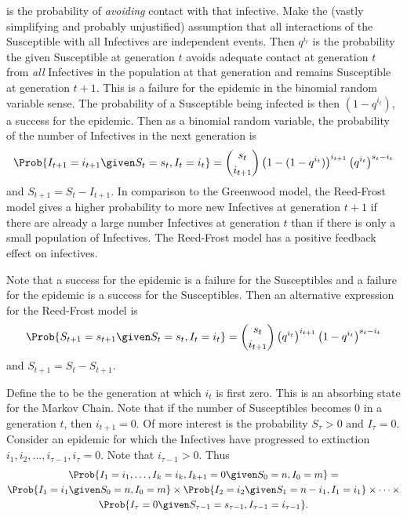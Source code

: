 \documentclass[12pt]{article}
\begin{document}
is the probability of \emph{avoiding} contact with that infective.  Make
the (vastly simplifying and probably unjustified) assumption that all
interactions of the Susceptible with all Infectives are independent
events. Then \( q^{i_t} \) is the probability the given Susceptible at
generation \( t \) avoids adequate contact at generation \( t \) from
\emph{all} Infectives in the population at that generation and remains
Susceptible at generation \( t + 1 \).  This is a failure for the
epidemic in the binomial random variable sense.  The probability of a
Susceptible being infected is then \( (1 - q^{i_t}) \), a success for
the epidemic.  Then as a binomial random variable, the probability of
the number of Infectives in the next generation is
\[
    \Prob{I_{t+1} = i_{t+1} \given S_t=s_t, I_t=i_t} = \binom{s_t}{i_{t+1}}
    \left(1 - (1-q^{i_t})\right)^{i_{t+1}}\left(q^{i_t}\right)^{s_t-i_t}
\] and \( S_{t+1} = S_t - I_{t+1} \). In comparison to the Greenwood
model, the Reed-Frost model gives a higher probability to more new
Infectives at generation \( t+1 \) if there are already a large number
Infectives at generation \( t \) than if there is only a small
population of Infectives. The Reed-Frost model has a positive feedback
effect on infectives.

Note that a success for the epidemic is a failure for the Susceptibles
and a failure for the epidemic is a success for the Susceptibles. Then
an alternative expression for the Reed-Frost model is
\[
    \Prob{S_{t+1} = s_{t+1} \given S_t=s_t, I_t=i_t} = \binom{s_t}{i_{t+1}}
    \left( q^{i_t}\right)^{i_{t+1}}\left(1 - q^{i_t}\right)^{s_t-i_t}
\] and \( S_{t+1} = S_t - S_{t+1} \).

Define the  to be the
generation at which \( i_t \) is first zero.  This is an absorbing state
for the Markov Chain.  Note that if the number of Susceptibles becomes \(
0 \) in a generation \( t \), then \( i_{t+1} = 0 \).  Of more interest
is the probability \( S_{\tau} > 0 \) and \( I_{\tau} = 0 \).  Consider
an epidemic for which the Infectives have progressed to extinction \( i_1,
i_2, \ldots, i_{\tau-1}, i_{\tau} = 0 \).  Note that \( i_{\tau - 1} > 0
\).  Thus
\begin{multline*}
    \Prob{I_1 =i_1, \ldots, I_{k}=i_k, I_{k+1}=0 \given S_0=n, I_0=m} =
    \\
    \Prob{I_1=i_1 \given S_0=n, I_0=m}\times \Prob{I_2=i_2 \given S_1=n-i_1,
    I_1=i_1}\times\cdots\times \\
    \Prob{I_{\tau}=0 \given S_{\tau - 1}=s_{\tau - 1}, I_{\tau - 1}=i_{\tau
    - 1}}.
\end{multline*}
\end{document}
